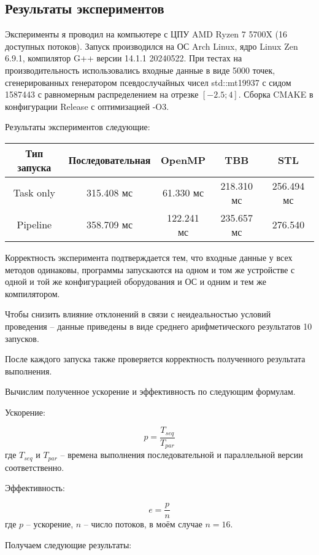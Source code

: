 \documentclass[a4paper,12pt]{article}
\begin{document}
\subsection{Результаты экспериментов}

Эксперименты я проводил на компьютере с ЦПУ AMD Ryzen 7 5700X (16 доступных потоков). Запуск производился на 
ОС Arch Linux, ядро Linux Zen 6.9.1, компилятор G++ версии 14.1.1 20240522.
При тестах на производительность использовались входные данные в виде 5000 точек, сгенерированных 
генератором псевдослучайных чисел std::mt19937 с сидом 1587443 с равномерным распределением
на отрезке $[-2.5; 4]$. Сборка CMAKE в конфигурации Release с оптимизацией -O3.

Результаты экспериментов следующие:


\begin{center}
    \begin{tabular}{ |c|c|c|c|c| }
        \hline
        Тип запуска & Последовательная & OpenMP & TBB & STL \\
        \hline
        Task only & 315.408 мс & 61.330 мс & 218.310 мс & 256.494 мс \\
        \hline
        Pipeline & 358.709 мс & 122.241 мс & 235.657 мс & 276.540 \\
        \hline
    \end{tabular}
\end{center}

Корректность эксперимента подтверждается тем, что входные данные у всех методов одинаковы, 
программы запускаются на одном и том же устройстве с одной и той же конфигурацией оборудования и ОС и одним
и тем же компилятором. 

Чтобы снизить влияние отклонений в связи с неидеальностью условий проведения -- данные приведены 
в виде среднего арифметического результатов 10 запусков. 

После каждого запуска также проверяется корректность полученного результата выполнения.

Вычислим полученное ускорение и эффективность по следующим формулам.

Ускорение:

$$p = \frac{T_{seq}}{T_{par}}$$
где $T_{seq}$ и $T_{par}$ -- времена выполнения последовательной и параллельной версии соответственно.

Эффективность:

$$e = \frac{p}{n}$$
где $p$ -- ускорение, $n$ -- число потоков, в моём случае $n = 16$.

Получаем следующие результаты:
\end{document}
